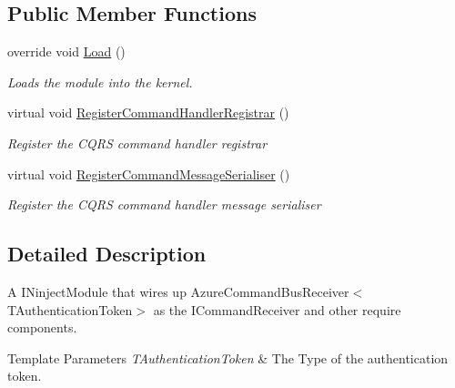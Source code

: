 \subsection*{Public Member Functions}
\begin{DoxyCompactItemize}
\item 
override void \hyperlink{classCqrs_1_1Azure_1_1EventHub_1_1CommandBus_1_1Configuration_1_1AzureCommandHubReceiverModule_ab65cf33e1922ba757c75da121585a2dc_ab65cf33e1922ba757c75da121585a2dc}{Load} ()
\begin{DoxyCompactList}\small\item\em Loads the module into the kernel. \end{DoxyCompactList}\item 
virtual void \hyperlink{classCqrs_1_1Azure_1_1EventHub_1_1CommandBus_1_1Configuration_1_1AzureCommandHubReceiverModule_af897af12233fca45836069cc9fcc6f38_af897af12233fca45836069cc9fcc6f38}{Register\+Command\+Handler\+Registrar} ()
\begin{DoxyCompactList}\small\item\em Register the C\+Q\+RS command handler registrar \end{DoxyCompactList}\item 
virtual void \hyperlink{classCqrs_1_1Azure_1_1EventHub_1_1CommandBus_1_1Configuration_1_1AzureCommandHubReceiverModule_a980e8c541dc2423c9c09aa51753a6d82_a980e8c541dc2423c9c09aa51753a6d82}{Register\+Command\+Message\+Serialiser} ()
\begin{DoxyCompactList}\small\item\em Register the C\+Q\+RS command handler message serialiser \end{DoxyCompactList}\end{DoxyCompactItemize}


\subsection{Detailed Description}
A I\+Ninject\+Module that wires up Azure\+Command\+Bus\+Receiver$<$\+T\+Authentication\+Token$>$ as the I\+Command\+Receiver and other require components. 


\begin{DoxyTemplParams}{Template Parameters}
{\em T\+Authentication\+Token} & The Type of the authentication token.\\
\hline
\end{DoxyTemplParams}


